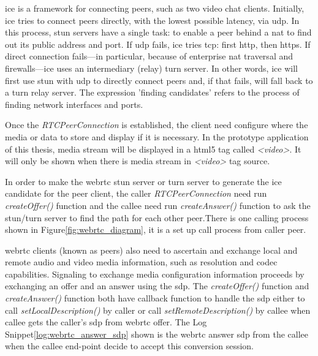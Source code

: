 \par \gls{ice} is a framework for connecting peers, such as two video chat clients. Initially, \gls{ice} tries to connect peers directly, with the lowest possible latency, via \gls{udp}. In this process, \gls{stun} servers have a single task: to enable a peer behind a \gls{nat} to find out its public address and port. If \gls{udp} fails, \gls{ice} tries \gls{tcp}: first \gls{http}, then \gls{https}. If direct connection fails—in particular, because of enterprise \gls{nat} traversal and firewalls—\gls{ice} uses an intermediary (relay) \gls{turn} server. In other words, \gls{ice} will first use \gls{stun} with \gls{udp} to directly connect peers and, if that fails, will fall back to a \gls{turn} relay server. The expression 'finding candidates' refers to the process of finding network interfaces and ports.\cite{html5rock:webrtc} 

\par Once the \textit{RTCPeerConnection} is established, the client need configure where the media or data to store and display if it is necessary. In the prototype application of this thesis, media stream will be displayed in a \gls{html5} tag called \textit{<video>}. It will only be shown when there is media stream in \textit{<video>} tag source.

\par In order to make the \gls{webrtc} \gls{stun} server or \gls{turn} server to generate the \gls{ice} candidate for the peer client, the caller \textit{RTCPeerConnection} need run \textit{createOffer()} function and the callee need run \textit{createAnswer()} function  to ask the \gls{stun}/\gls{turn} server to find the path for each other peer.There is one calling process shown in Figure\ref{fig:webrtc_diagram}, it is a set up call process from caller peer.

\par \gls{webrtc} clients (known as peers) also need to ascertain and exchange local and remote audio and video media information, such as resolution and codec capabilities. Signaling to exchange media configuration information proceeds by exchanging an offer and an answer using the \gls{sdp}. The \textit{createOffer()} function and \textit{createAnswer()} function both have callback function to handle the \gls{sdp} either to call \textit{setLocalDescription()} by caller or call \textit{setRemoteDescription()} by callee when callee gets the caller's \gls{sdp} from \gls{webrtc} offer. The Log Snippet\ref{log:webrtc_answer_sdp} shown is the \gls{webrtc} answer \gls{sdp} from the callee when the callee end-point decide to accept this conversion session.

